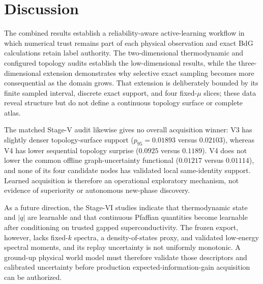 \section{Discussion}
The combined results establish a reliability-aware active-learning workflow in which numerical trust remains part of each physical observation and exact BdG calculations retain label authority. The two-dimensional thermodynamic and configured topology audits establish the low-dimensional results, while the three-dimensional extension demonstrates why selective exact sampling becomes more consequential as the domain grows. That extension is deliberately bounded by its finite sampled interval, discrete exact support, and four fixed-$\mu$ slices; these data reveal structure but do not define a continuous topology surface or complete atlas.

The matched Stage-V audit likewise gives no overall acquisition winner: V3 has slightly denser topology-surface support ($p_{95}=0.01893$ versus $0.02103$), whereas V4 has lower sequential topology surprise ($0.0925$ versus $0.1189$). V4 does not lower the common offline graph-uncertainty functional ($0.01217$ versus $0.01114$), and none of its four candidate nodes has validated local same-identity support. Learned acquisition is therefore an operational exploratory mechanism, not evidence of superiority or autonomous new-phase discovery.

As a future direction, the Stage-VI studies indicate that thermodynamic state and $|q|$ are learnable and that continuous Pfaffian quantities become learnable after conditioning on trusted gapped superconductivity. The frozen export, however, lacks fixed-$k$ spectra, a density-of-states proxy, and validated low-energy spectral moments, and its replay uncertainty is not uniformly monotonic. A ground-up physical world model must therefore validate those descriptors and calibrated uncertainty before production expected-information-gain acquisition can be authorized.
